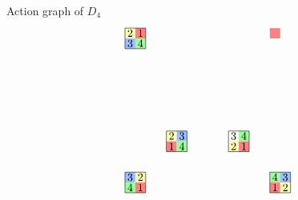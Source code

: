 \documentclass[8pt,handout]{beamer}
\begin{document}
\begin{frame}{Action graph of $D_4$}
\[\begin{tikzpicture}
\begin{scope}[scale=.65]
\begin{scope}[shift={(3,-3)}]
        \path[fill=actGreen] (.5,.5) rectangle ++(.5,.5);
        \path[fill=actYellow] (0,0) rectangle ++(.5,.5);
        \path[fill=actRed] (.5,0) rectangle ++(.5,.5);
        \draw (0,0) rectangle (1,1);
        \draw (.25,.75) node{$3$}; \draw (.75,.75) node{$4$};
        \draw (.25,.25) node{$2$}; \draw (.75,.25) node{$1$};
      \end{scope}
      \begin{scope}[shift={(0,-3)}]
        \path[fill=actYellow] (0,.5) rectangle ++(.5,.5); 
        \path[fill=actBlue] (.5,.5) rectangle ++(.5,.5);
        \path[fill=actRed] (0,0) rectangle ++(.5,.5);
        \path[fill=actGreen] (.5,0) rectangle ++(.5,.5);
        \draw (0,0) rectangle (1,1);
        \draw (.25,.75) node{$2$}; \draw (.75,.75) node{$3$};
        \draw (.25,.25) node{$1$}; \draw (.75,.25) node{$4$};
      \end{scope}
      \begin{scope}[shift={(-2,2)}]
        \path[fill=actYellow] (0,.5) rectangle ++(.5,.5); 
        \path[fill=actRed] (.5,.5) rectangle ++(.5,.5);
        \path[fill=actBlue] (0,0) rectangle ++(.5,.5);
        \path[fill=actGreen] (.5,0) rectangle ++(.5,.5);
        \draw (0,0) rectangle (1,1);
        \draw (.25,.75) node{$2$}; \draw (.75,.75) node{$1$};
        \draw (.25,.25) node{$3$}; \draw (.75,.25) node{$4$};
      \end{scope}
      \begin{scope}[shift={(-2,-5)}]
        \path[fill=actBlue] (0,.5) rectangle ++(.5,.5); 
        \path[fill=actYellow] (.5,.5) rectangle ++(.5,.5);
        \path[fill=actGreen] (0,0) rectangle ++(.5,.5);
        \path[fill=actRed] (.5,0) rectangle ++(.5,.5);
        \draw (0,0) rectangle (1,1);
        \draw (.25,.75) node{$3$}; \draw (.75,.75) node{$2$};
        \draw (.25,.25) node{$4$}; \draw (.75,.25) node{$1$};
      \end{scope}
      \begin{scope}[shift={(5,-5)}]
        \path[fill=actGreen] (0,.5) rectangle ++(.5,.5); 
        \path[fill=actBlue] (.5,.5) rectangle ++(.5,.5);
        \path[fill=actRed] (0,0) rectangle ++(.5,.5);
        \path[fill=actYellow] (.5,0) rectangle ++(.5,.5);
        \draw (0,0) rectangle (1,1);
        \draw (.25,.75) node{$4$}; \draw (.75,.75) node{$3$};
        \draw (.25,.25) node{$1$}; \draw (.75,.25) node{$2$};
      \end{scope}
      \begin{scope}[shift={(5,2)}]
        \path[fill=actRed] (0,.5) rectangle ++(.5,.5); 

\end{scope}
\end{scope}
\end{tikzpicture}\]
\end{frame}
\end{document}
